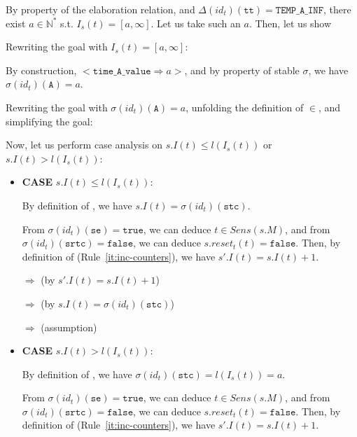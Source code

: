 \documentclass[dvipsnames,12pt]{article}
\begin{document}
\begin{niproof}
\begin{enumerate}
\begin{enumerate}
\begin{enumerate}
        By property of the elaboration relation, and
        $\Delta(id_t)(\texttt{tt})=\mathtt{TEMP\_A\_INF}$, there exist
        $a\in\mathbb{N}^{*}$ s.t. $I_s(t)=[a,\infty]$. Let us take
        such an $a$. Then, let us show 

        Rewriting the goal with $I_s(t)=[a,\infty]$:
        
        By construction,
        ${<}\mathtt{time\_A\_value\Rightarrow}{}a{>}$, and by property
        of stable $\sigma$, we have\\ $\sigma(id_t)(\texttt{A})=a$.

        Rewriting the goal with $\sigma(id_t)(\texttt{A})=a$, unfolding the
        definition of $\in$, and simplifying the goal:

        Now, let us perform case analysis on
        $s.I(t)\le{}l(I_s(t))$ or $s.I(t)>l(I_s(t))$:
        \begin{itemize}
        \item \textbf{CASE} $s.I(t)\le{}l(I_s(t))$:
          
          By definition of \upSim, we have $s.I(t)=\sigma(id_t)(\texttt{stc})$.

          From $\sigma(id_t)(\texttt{se})=\mathtt{true}$, we can deduce
          $t\in{}Sens(s.M)$, and from
          $\sigma(id_t)(\texttt{srtc})=\mathtt{false}$, we can deduce
          $s.reset_t(t)=\mathtt{false}$. Then, by definition of
          \dwSitpn{} (Rule~\ref{it:inc-counters}), we have
          $s'.I(t)=s.I(t)+1$.

          $\Rightarrow{}$
           (by $s'.I(t)=s.I(t)+1$)

          $\Rightarrow{}$
           (by
          $s.I(t)=\sigma(id_t)(\texttt{stc})$)

          $\Rightarrow{}$
          (assumption)
          
        \item \textbf{CASE} $s.I(t)>l(I_s(t))$:

          By definition of \upSim, we have
          $\sigma(id_t)(\texttt{stc})=l(I_s(t))=a$.

          From $\sigma(id_t)(\texttt{se})=\mathtt{true}$, we can deduce
          $t\in{}Sens(s.M)$, and from
          $\sigma(id_t)(\texttt{srtc})=\mathtt{false}$, we can deduce
          $s.reset_t(t)=\mathtt{false}$. Then, by definition of
          \dwSitpn{} (Rule~\ref{it:inc-counters}), we have
          $s'.I(t)=s.I(t)+1$.


\end{itemize}
\end{enumerate}
\end{enumerate}
\end{enumerate}
\end{niproof}
\end{document}
